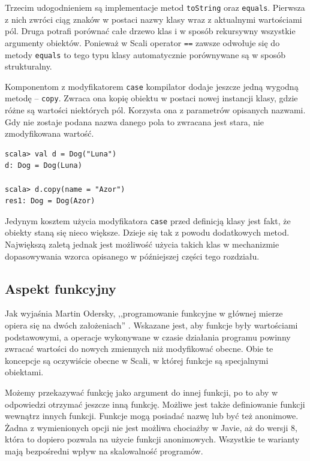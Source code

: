 \documentclass[brudnopis]{xmgr}
\begin{document}
Trzecim udogodnieniem są implementacje metod \texttt{toString} oraz \texttt{equals}. Pierwsza z nich zwróci ciąg znaków w postaci nazwy klasy wraz z aktualnymi wartościami pól. Druga potrafi porównać całe drzewo klas i w sposób rekursywny wszystkie argumenty obiektów. Ponieważ w Scali operator \texttt{==} zawsze odwołuje się do metody \texttt{equals} to tego typu klasy automatycznie porównywane są w sposób strukturalny.    

Komponentom z modyfikatorem \texttt{case} kompilator dodaje jeszcze jedną wygodną metodę -- \texttt{copy}. Zwraca ona kopię obiektu w postaci nowej instancji klasy, gdzie różne są wartości niektórych pól. Korzysta ona z parametrów opisanych nazwami. Gdy nie zostaje podana nazwa danego pola to zwracana jest stara, nie zmodyfikowana wartość. 

\begin{verbatim}
scala> val d = Dog("Luna")
d: Dog = Dog(Luna)

scala> d.copy(name = "Azor")
res1: Dog = Dog(Azor)
\end{verbatim}

Jedynym kosztem użycia modyfikatora \texttt{case} przed definicją klasy jest fakt, że obiekty staną się nieco większe. Dzieje się tak z powodu dodatkowych metod. Największą zaletą jednak jest możliwość użycia takich klas w mechanizmie dopasowywania wzorca opisanego w późniejszej części tego rozdziału.

\subsection{Aspekt funkcyjny}

Jak wyjaśnia Martin Odersky, ,,programowanie funkcyjne w głównej mierze opiera się na dwóch założeniach'' \cite[s.57]{Odersky:2010:PIS}. Wskazane jest, aby funkcje były wartościami podstawowymi, a operacje wykonywane w czasie działania programu powinny zwracać wartości do nowych zmiennych niż modyfikować obecne. Obie te koncepcje są oczywiście obecne w Scali, w której funkcje są specjalnymi obiektami. 

Możemy przekazywać funkcję jako argument do innej funkcji, po to aby w odpowiedzi otrzymać jeszcze inną funkcję. Możliwe jest także definiowanie funkcji wewnątrz innych funkcji. Funkcje mogą posiadać nazwę lub być też anonimowe. Żadna z wymienionych opcji nie jest możliwa chociażby w Javie, aż do wersji 8, która to dopiero pozwala na użycie funkcji anonimowych. Wszystkie te warianty mają bezpośredni wpływ na skalowalność programów.
\end{document}
